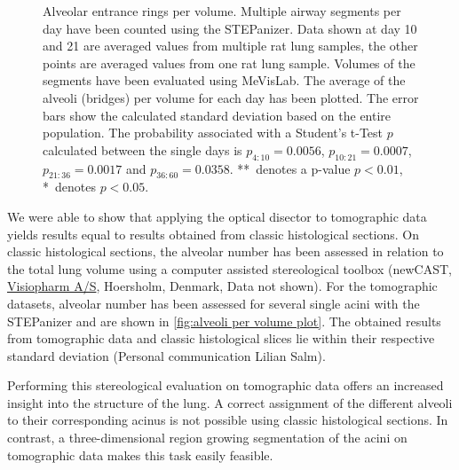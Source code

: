\begin{figure}[htb]%
	\centering
	\caption[Alveolar entrance rings per volume]{Alveolar entrance rings per volume. Multiple airway segments per day have been counted using the STEPanizer. Data shown at day 10 and 21 are averaged values from multiple rat lung samples, the other points are averaged values from one rat lung sample. Volumes of the segments have been evaluated using MeVisLab. The average of the alveoli (bridges) per volume for each day has been plotted. The error bars show the calculated standard deviation based on the entire population. The probability associated with a Student's t-Test $p$ calculated between the single days is $p_{4:10}=0.0056$, $p_{10:21}=0.0007$, $p_{21:36}=0.0017$ and $p_{36:60}=0.0358$. **~denotes a p-value $p<0.01$, *~denotes $p<0.05$.}
	\label{fig:alveoli per volume plot}
\end{figure}%

We were able to show that applying the optical disector \cite{Sterio1984,Hsia2010} to tomographic data yields results equal to results obtained from classic histological sections. On classic histological sections, the alveolar number has been assessed in relation to the total lung volume using a computer assisted stereological toolbox (newCAST, \href{http://visiopharm.com/}{Visiopharm A/S}, Hoersholm, Denmark, Data not shown). For the tomographic datasets, alveolar number has been assessed for several single acini with the STEPanizer and are shown in \autoref{fig:alveoli per volume plot}. The obtained results from tomographic data and classic histological slices lie within their respective standard deviation (Personal communication Lilian Salm).

Performing this stereological evaluation on tomographic data offers an increased insight into the structure of the lung. A correct assignment of the different alveoli to their corresponding acinus is not possible using classic histological sections. In contrast, a three-dimensional region growing segmentation of the acini on tomographic data makes this task easily feasible.

